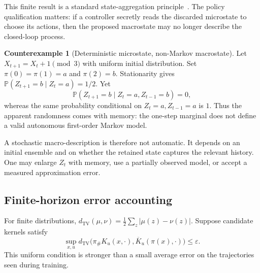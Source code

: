 \documentclass[11pt,letterpaper]{article}
\theoremstyle{plain}
\theoremstyle{definition}
\newtheorem{counterexample}[proposition]{Counterexample}
\theoremstyle{remark}
\newcommand{\TV}{d_{\mathrm{TV}}}
\newcommand{\Prob}{\mathbb P}
\newcommand{\push}{\pi_{\#}}
\begin{document}
This finite result is a standard state-aggregation principle~\cite{givan}. The policy qualification matters: if a controller secretly reads the discarded microstate to choose its actions, then the proposed macrostate may no longer describe the closed-loop process.

\begin{counterexample}[Deterministic microstate, non-Markov macrostate]\label{ex:cycle}
Let $X_{t+1}=X_t+1\pmod 3$ with uniform initial distribution. Set $\pi(0)=\pi(1)=a$ and $\pi(2)=b$. Stationarity gives $\Prob(Z_{t+1}=b\mid Z_t=a)=1/2$. Yet
\[
\Prob(Z_{t+1}=b\mid Z_t=a,Z_{t-1}=b)=0,
\]
whereas the same probability conditional on $Z_t=a,Z_{t-1}=a$ is $1$. Thus the apparent randomness comes with memory: the one-step marginal does not define a valid autonomous first-order Markov model.
\end{counterexample}

A stochastic macro-description is therefore not automatic. It depends on an initial ensemble and on whether the retained state captures the relevant history. One may enlarge $Z_t$ with memory, use a partially observed model, or accept a measured approximation error.

\subsection{Finite-horizon error accounting}
For finite distributions, $\TV(\mu,\nu)=\tfrac12\sum_z|\mu(z)-\nu(z)|$. Suppose candidate kernels satisfy
\begin{equation}\label{eq:eps}
\sup_{x,u}\TV\bigl(\push K_u(x,\cdot),\overline K_u(\pi(x),\cdot)\bigr)
\leq\varepsilon.
\end{equation}
This uniform condition is stronger than a small average error on the trajectories seen during training.
\end{document}
